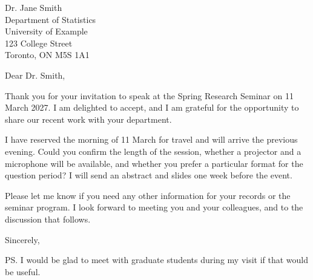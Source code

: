 \documentclass[
  fontsize=11pt,
  parskip=half,
  fromalign=right,
  fromphone=true,
  fromemail=true,
  foldmarks=false,
  subject=beforeopening,
]{scrlttr2}
\begin{document}
\begin{letter}{Dr. Jane Smith\\
Department of Statistics\\
University of Example\\
123 College Street\\
Toronto, ON M5S 1A1}

\opening{Dear Dr. Smith,}

Thank you for your invitation to speak at the Spring Research Seminar on 11 March 2027. I am delighted to accept, and I am grateful for the opportunity to share our recent work with your department.

I have reserved the morning of 11 March for travel and will arrive the previous evening. Could you confirm the length of the session, whether a projector and a microphone will be available, and whether you prefer a particular format for the question period? I will send an abstract and slides one week before the event.

Please let me know if you need any other information for your records or the seminar program. I look forward to meeting you and your colleagues, and to the discussion that follows.

\closing{Sincerely,}

\ps
I would be glad to meet with graduate students during my visit if that would be useful.


\end{letter}
\end{document}
